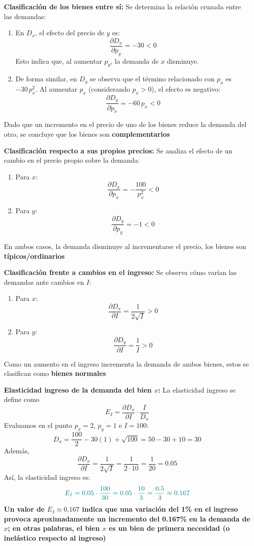 \documentclass{article}
\begin{document}
\textbf{Clasificación de los bienes entre sí:}  
    Se determina la relación cruzada entre las demandas:
    \begin{enumerate}
        \item En \(D_x\), el efecto del precio de \(y\) es:
        \[
        \frac{\partial D_x}{\partial p_y} = -30 < 0
        \]
        Esto indica que, al aumentar \(p_y\), la demanda de \(x\) disminuye.
        \item De forma similar, en \(D_y\) se observa que el término relacionado con \(p_x\) es \(-30\,p_x^2\). Al aumentar \(p_x\) (considerando \(p_x>0\)), el efecto es negativo:
        \[
        \frac{\partial D_y}{\partial p_x} = -60\,p_x < 0
        \]
    \end{enumerate}
    Dado que un incremento en el precio de uno de los bienes reduce la demanda del otro, se concluye que los bienes son \textbf{\color{teal}complementarios}
    
    \textbf{Clasificación respecto a sus propios precios:}  
    Se analiza el efecto de un cambio en el precio propio sobre la demanda:
    \begin{enumerate}
        \item Para \(x\):
        \[
        \frac{\partial D_x}{\partial p_x} = -\frac{100}{p_x^2} < 0
        \]
        \item Para \(y\):
        \[
        \frac{\partial D_y}{\partial p_y} = -1 < 0
        \]
    \end{enumerate}
    En ambos casos, la demanda disminuye al incrementarse el precio, los bienes son \textbf{\color{teal}típicos/ordinarios}
    
   \textbf{Clasificación frente a cambios en el ingreso:}  
    Se observa cómo varían las demandas ante cambios en \(I\):
    \begin{enumerate}
        \item Para \(x\):
        \[
        \frac{\partial D_x}{\partial I} = \frac{1}{2\sqrt{I}} > 0
        \]
        \item Para \(y\):
        \[
        \frac{\partial D_y}{\partial I} = \frac{1}{I} > 0
        \]
    \end{enumerate}
    Como un aumento en el ingreso incrementa la demanda de ambos bienes, estos se clasifican como \textbf{\color{teal}bienes normales}
    
 \textbf{Elasticidad ingreso de la demanda del bien \(x\):}  
    La elasticidad ingreso se define como
    \[
    E_I = \frac{\partial D_x}{\partial I} \cdot \frac{I}{D_x}
    \]
    Evaluamos en el punto \(p_x=2\), \(p_y=1\) e \(I=100\):
    \[
    D_x = \frac{100}{2} - 30(1) + \sqrt{100} = 50 - 30 + 10 = 30
    \]
    Además,
    \[
    \frac{\partial D_x}{\partial I} = \frac{1}{2\sqrt{I}} = \frac{1}{2\cdot10} = \frac{1}{20} = 0.05
    \]
    Así, la elasticidad ingreso es:
    \[\color{teal}
    E_I = 0.05\cdot\frac{100}{30} = 0.05\cdot\frac{10}{3} = \frac{0.5}{3} \approx 0.167
    \]
    \textbf{\color{teal}Un valor de \(E_I \approx 0.167\) indica que una variación del 1\% en el ingreso provoca aproximadamente un incremento del 0.167\% en la demanda de \(x\); en otras palabras, el bien \(x\) es un \textbf{bien de primera necesidad} (o inelástico respecto al ingreso)}
\newpage
\end{document}
